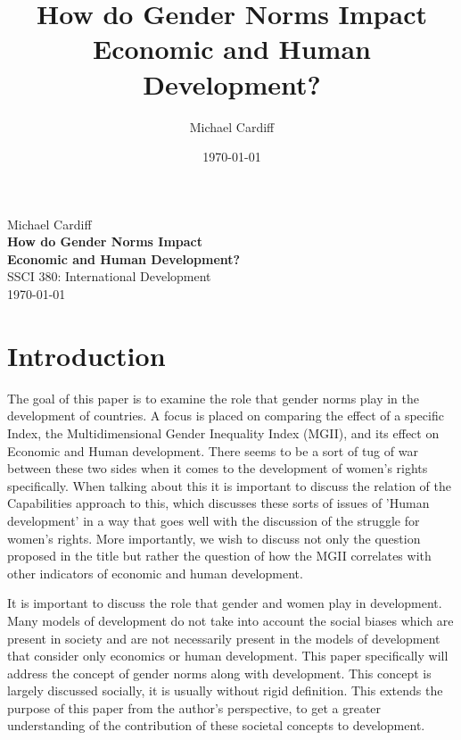 \documentclass[12pt, letterpaper]{article}
\title{How do Gender Norms Impact \\ Economic and Human Development?}
\author{Michael Cardiff}
\date{\today}
\begin{document}
\begin{titlepage}
  \begin{center}
    \vspace*{7cm} \large
    Michael Cardiff \\
    \vspace*{0.5cm} \Large
    \textbf{How do Gender Norms Impact \\ Economic and Human Development?}\\
    \vspace{0.5cm} \large
    SSCI 380: International Development\\ \vspace{0.5cm}
    \today
    \vfill
  \end{center}
\end{titlepage}

\section{Introduction}
The goal of this paper is to examine the role that gender norms play in the development of countries. A focus is placed on comparing the effect of a specific Index, the Multidimensional Gender Inequality Index (MGII), and its effect on Economic and Human development.  There seems to be a sort of tug of war between these two sides when it comes to the development of women's rights specifically. When talking about this it is important to discuss the relation of the Capabilities approach to this, which discusses these sorts of issues of 'Human development' in a way that goes well with the discussion of the struggle for women's rights. More importantly, we wish to discuss not only the question proposed in the title but rather the question of how the MGII correlates with other indicators of economic and human development.

It is important to discuss the role that gender and women play in development. Many models of development do not take into account the social biases which are present in society and are not necessarily present in the models of development that consider only economics or human development. This paper specifically will address the concept of gender norms along with development. This concept is largely discussed socially, it is usually without rigid definition. This extends the purpose of this paper from the author's perspective, to get a greater understanding of the contribution of these societal concepts to development.
\end{document}

